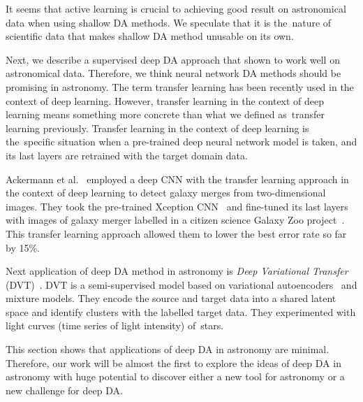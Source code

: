 It seems that active learning is crucial
to achieving good result on astronomical data when using shallow DA methods.
We speculate that it is the~nature of scientific data
that makes shallow DA method unusable on its own.

Next, we describe a supervised deep DA  approach
that shown to work well on astronomical data.
Therefore, we think neural network DA methods should be promising in astronomy.
The term transfer learning has been recently used in the context of deep learning.
However, transfer learning in the context of deep learning means something more concrete than what we defined as~transfer learning previously.
Transfer learning in the context of deep learning is the~specific situation
when a pre-trained deep neural network model is taken,
and its last layers are retrained with the target domain data.

Ackermann et al.~\cite{ackermann2018} employed a deep CNN
with the transfer learning approach
in the context of deep learning to detect galaxy merges
from two-dimensional images.
They took the pre-trained Xception CNN~\cite{chollet2017}
and fine-tuned its last layers with images of galaxy merger labelled
in a citizen science Galaxy Zoo project~\cite{lintott2010}.
This transfer learning approach allowed them to lower the best error rate so far by 15\%.

Next application of deep DA method in astronomy is \textit{Deep Variational Transfer} (DVT)~\cite{belhaj2018}.
DVT is a semi-supervised model based on variational autoencoders~\cite{kingma2014a} and mixture models.
They encode the source and target data into a shared latent space
and identify clusters with the labelled target data.
They experimented with light curves (time series of light intensity) of~stars.

This section shows that applications of deep DA in astronomy are minimal.
Therefore, our work will be almost the first to explore the ideas
of deep DA in astronomy with huge potential to discover
either a new tool for astronomy or a new challenge for deep DA.
